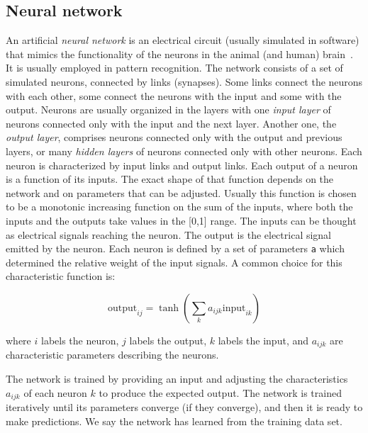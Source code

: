 \documentclass[justified,sixbynine]{tufte-book}
\def\ft{\small\tt}
\theoremstyle{plain}%
\theoremstyle{definition}
\theoremstyle{remark}
\begin{document}
\begin{fullwidth}
\goodbreak\subsection{Neural network}


An artificial {\it neural network} is an electrical circuit (usually simulated in software) that mimics the functionality of the neurons in the animal (and human) brain~\cite{neural}. It is usually employed in pattern recognition. The network consists of a set of simulated neurons, connected by links (synapses). Some links connect the neurons with each other, some connect the neurons with the input and some with the output. Neurons are usually organized in the layers with one {\it input layer} of neurons connected only with the input and the next layer.  Another one, the {\it output layer}, comprises neurons connected only with the output and previous layers, or many {\it hidden layers} of neurons connected only with other neurons.
Each neuron is characterized by input links and output links. Each output of a neuron is a function of its inputs. The exact shape of that function depends on the network and on parameters that can be adjusted. Usually this function is chosen to be a monotonic increasing function on the sum of the inputs, where both the inputs and the outputs take values in the [0,1] range. The inputs can be thought as electrical signals reaching the neuron. The output is the electrical signal emitted by the neuron. Each neuron is defined by a set of parameters {\ft a} which determined the relative weight of the input signals. A common choice for this characteristic function is:

\begin{equation}
\textrm{output}_{ij} = \tanh(\sum_k a_{ijk} \textrm{input}_{ik})
\end{equation}

where $i$ labels the neuron, $j$ labels the output, $k$ labels the input, and $a_{ijk}$ are characteristic parameters describing the neurons.

The network is trained by providing an input and adjusting the characteristics $a_{ijk}$ of each neuron $k$ to produce the expected output. The network is trained iteratively until its parameters converge (if they converge), and then it is ready to make predictions. We say the network has learned from the training data set.


\end{fullwidth}
\end{document}
